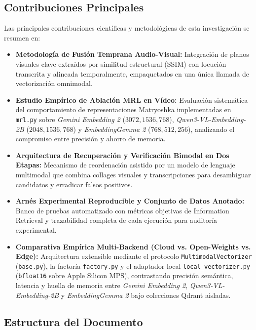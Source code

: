 \subsection{Contribuciones Principales}
\label{subsec:contribuciones}

Las principales contribuciones científicas y metodológicas de esta investigación se resumen en:
\begin{itemize}
    \item \textbf{Metodología de Fusión Temprana Audio-Visual:} Integración de planos visuales clave extraídos por similitud estructural (SSIM) con locución transcrita y alineada temporalmente, empaquetados en una única llamada de vectorización omnimodal.
    \item \textbf{Estudio Empírico de Ablación MRL en Vídeo:} Evaluación sistemática del comportamiento de representaciones Matryoshka implementadas en \texttt{mrl.py} sobre \textit{Gemini Embedding 2} ($3072, 1536, 768$), \textit{Qwen3-VL-Embedding-2B} ($2048, 1536, 768$) y \textit{EmbeddingGemma 2} ($768, 512, 256$), analizando el compromiso entre precisión y ahorro de memoria.
    \item \textbf{Arquitectura de Recuperación y Verificación Bimodal en Dos Etapas:} Mecanismo de reordenación asistido por un modelo de lenguaje multimodal que combina collages visuales y transcripciones para desambiguar candidatos y erradicar falsos positivos.
    \item \textbf{Arnés Experimental Reproducible y Conjunto de Datos Anotado:} Banco de pruebas automatizado con métricas objetivas de Information Retrieval y trazabilidad completa de cada ejecución para auditoría experimental.
    \item \textbf{Comparativa Empírica Multi-Backend (Cloud vs. Open-Weights vs. Edge):} Arquitectura extensible mediante el protocolo \texttt{MultimodalVectorizer} (\texttt{base.py}), la factoría \texttt{factory.py} y el adaptador local \texttt{local\_vectorizer.py} (\texttt{bfloat16} sobre Apple Silicon MPS), contrastando precisión semántica, latencia y huella de memoria entre \textit{Gemini Embedding 2}, \textit{Qwen3-VL-Embedding-2B} y \textit{EmbeddingGemma 2} bajo colecciones Qdrant aisladas.
\end{itemize}

\subsection{Estructura del Documento}
\label{subsec:estructura_memoria}

